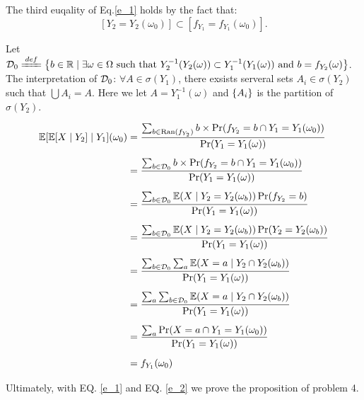 \documentclass{article}
\begin{document}
The third euqality of Eq.\ref{e_1} holds by the fact that:
\[
	[Y_2=Y_2(\omega_0)]\subset[f_{Y_1}=f_{Y_1}(\omega_0)]
.\] 

Let $\+D_0\deq \set{b\in\RR\mid \exists \omega\in\Omega \mbox{ such that } Y_2^{-1}(Y_2(\omega))\subset Y_1^{-1}(Y_1(\omega))\mbox{ and } b=f_{Y_2}(\omega)}$. The interpretation of $\mathcal{D}_0$: $\forall A\in\sigma(Y_1)$, there exsists serveral sets $A_i\in\sigma(Y_2)$ such that $\bigcup A_i=A$. Here we let $A=Y_1^{-1}(\omega)$ and $\qty{A_i}$ is the partition of $\sigma(Y_2)$.

\begin{equation}
	\begin{aligned}
		\mathbb{E}[\mathbb{E}[X\mid Y_2]\mid Y_1](\omega_0)
		&=
		\frac{\sum_{b\in\mathrm{Ran}(f_{Y_2})}b\times\Pr(f_{Y_2}=b\cap Y_1=Y_1(\omega_0))}
		{\Pr(Y_1=Y_1(\omega))}
		\\[5pt]&=
		\frac{\sum_{b\in\mathcal{D}_0}b\times\Pr(f_{Y_2}=b\cap Y_1=Y_1(\omega_0))}
		{\Pr(Y_1=Y_1(\omega))}
		\\[5pt]&=
		\frac{\sum_{b\in\mathcal{D}_0}\mathbb{E}(X\mid Y_2=Y_2(\omega_b))\Pr(f_{Y_2}=b)}
		{\Pr(Y_1=Y_1(\omega))}
		\\[5pt]&=
		\frac{\sum_{b\in\mathcal{D}_0}\mathbb{E}(X\mid Y_2=Y_2(\omega_b))\Pr({Y_2}=Y_2(\omega_b))}
		{\Pr(Y_1=Y_1(\omega))}
		\\[5pt]&=
		\frac{\sum_{b\in\mathcal{D}_0}\sum_a\mathbb{E}(X=a\mid Y_2\cap Y_2(\omega_b))}
		{\Pr(Y_1=Y_1(\omega))}
		\\[5pt]&=
		\frac{\sum_a\sum_{b\in\mathcal{D}_0}\mathbb{E}(X=a\mid Y_2\cap Y_2(\omega_b))}
		{\Pr(Y_1=Y_1(\omega))}
		\\[5pt]&=
		\frac{\sum_a\Pr(X=a\cap Y_1=Y_1(\omega_0))}
		{\Pr(Y_1=Y_1(\omega))}
		\\[5pt]&=
		f_{Y_1}(\omega_0)
	\end{aligned}
	\label{e_2}
\end{equation}

Ultimately, with EQ. \ref{e_1} and EQ. \ref{e_2} we prove the proposition of problem 4.
\end{document}
